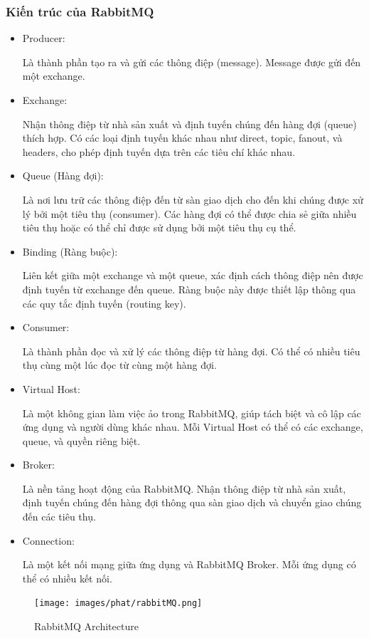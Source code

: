 \subsubsection{Kiến trúc của RabbitMQ}
\begin{itemize}
    \item Producer:

Là thành phần tạo ra và gửi các thông điệp (message).
Message được gửi đến một exchange.
    \item Exchange:

Nhận thông điệp từ nhà sản xuất và định tuyến chúng đến hàng đợi (queue) thích hợp.
Có các loại định tuyến khác nhau như direct, topic, fanout, và headers, cho phép định tuyến dựa trên các tiêu chí khác nhau.
    \item Queue (Hàng đợi):

Là nơi lưu trữ các thông điệp đến từ sàn giao dịch cho đến khi chúng được xử lý bởi một tiêu thụ (consumer).
Các hàng đợi có thể được chia sẻ giữa nhiều tiêu thụ hoặc có thể chỉ được sử dụng bởi một tiêu thụ cụ thể.
    \item Binding (Ràng buộc):

Liên kết giữa một exchange và một queue, xác định cách thông điệp nên được định tuyến từ exchange đến queue.
Ràng buộc này được thiết lập thông qua các quy tắc định tuyến (routing key).
    \item Consumer:

Là thành phần đọc và xử lý các thông điệp từ hàng đợi.
Có thể có nhiều tiêu thụ cùng một lúc đọc từ cùng một hàng đợi.
    \item Virtual Host:

Là một không gian làm việc ảo trong RabbitMQ, giúp tách biệt và cô lập các ứng dụng và người dùng khác nhau.
Mỗi Virtual Host có thể có các exchange, queue, và quyền riêng biệt.
    \item Broker:

Là nền tảng hoạt động của RabbitMQ.
Nhận thông điệp từ nhà sản xuất, định tuyến chúng đến hàng đợi thông qua sàn giao dịch và chuyển giao chúng đến các tiêu thụ.
    \item Connection:

Là một kết nối mạng giữa ứng dụng và RabbitMQ Broker.
Mỗi ứng dụng có thể có nhiều kết nối.
\end{itemize}
\begin{figure}[H]

    \begin{center}
    \texttt{[image: images/phat/rabbitMQ.png]}
    \vspace*{7mm}
    \caption{RabbitMQ Architecture}
    \end{center}
    \label{}
\end{figure}
